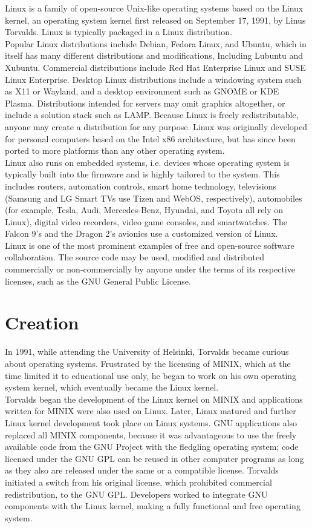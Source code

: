 \documentclass{article}
\begin{document}
\noindent
Linux is a family of open-source Unix-like operating systems based on the Linux kernel, an operating system kernel first released on September 17, 1991, by Linus Torvalds. Linux is typically packaged in a Linux distribution.\\
Popular Linux distributions include Debian, Fedora Linux, and Ubuntu, which in itself has many different distributions and modifications, Including Lubuntu and Xubuntu. Commercial distributions include Red Hat Enterprise Linux and SUSE Linux Enterprise. Desktop Linux distributions include a windowing system such as X11 or Wayland, and a desktop environment such as GNOME or KDE Plasma. Distributions intended for servers may omit graphics altogether, or include a solution stack such as LAMP. Because Linux is freely redistributable, anyone may create a distribution for any purpose.
Linux was originally developed for personal computers based on the Intel x86 architecture, but has since been ported to more platforms than any other operating system.\\
Linux also runs on embedded systems, i.e. devices whose operating system is typically built into the firmware and is highly tailored to the system. This includes routers, automation controls, smart home technology, televisions (Samsung and LG Smart TVs use Tizen and WebOS, respectively), automobiles (for example, Tesla, Audi, Mercedes-Benz, Hyundai, and Toyota all rely on Linux), digital video recorders, video game consoles, and smartwatches. The Falcon 9's and the Dragon 2's avionics use a customized version of Linux.\\
Linux is one of the most prominent examples of free and open-source software collaboration. The source code may be used, modified and distributed commercially or non-commercially by anyone under the terms of its respective licenses, such as the GNU General Public License.

\section*{Creation}
\noindent
In 1991, while attending the University of Helsinki, Torvalds became curious about operating systems. Frustrated by the licensing of MINIX, which at the time limited it to educational use only, he began to work on his own operating system kernel, which eventually became the Linux kernel.\\
Torvalds began the development of the Linux kernel on MINIX and applications written for MINIX were also used on Linux. Later, Linux matured and further Linux kernel development took place on Linux systems. GNU applications also replaced all MINIX components, because it was advantageous to use the freely available code from the GNU Project with the fledgling operating system; code licensed under the GNU GPL can be reused in other computer programs as long as they also are released under the same or a compatible license. Torvalds initiated a switch from his original license, which prohibited commercial redistribution, to the GNU GPL. Developers worked to integrate GNU components with the Linux kernel, making a fully functional and free operating system.
\end{document}
